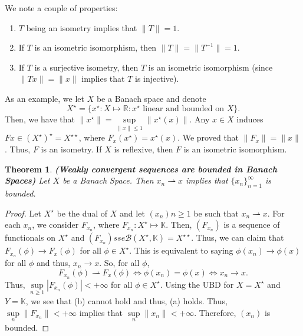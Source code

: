\documentclass[12pt]{article}
\newtheorem{theorem}{Theorem}
\newcommand{\R}{{\mathbb R}}
\def\K{\mathbb{K}}
\newcommand{\B}{\mathscr{B}}
\newcommand{\Xs}{X^{\star}}
\newcommand{\Xss}{X^{\star \star}}
\newcommand{\xst}{x^{\star}}
\newcommand{\weak}{\rightharpoonup}
\begin{document}
\vspace{-25pt}
We note a couple of properties:
\begin{enumerate}[topsep=-15pt, itemsep=0pt]
\item $T$ being an isometry implies that $\| T \| = 1$. 
\item If $T$ is an isometric isomorphism, then $\| T \| = \| T^{-1} \| = 1$. 
\item If $T$ is a surjective isometry, then $T$ is an isometric isomorphism (since $\| Tx \| = \| x \|$ implies that $T$ is injective).
\end{enumerate}
As an example, we let $X$ be a Banach space and denote 
\[ \Xs = \{ \xst: X \mapsto \R : \xst \text{ linear and bounded on } X \}. \]
Then, we have that $\| \xst \| = \sup\limits_{\| x \| \leq 1} \| \xst (x) \|$. Any $x \in X$ induces $Fx \in (\Xs)^{\star} = \Xss$, where $F_x(\xst) = \xst (x)$. We proved that $\| F_x \| = \| x \|$. Thus, $F$ is an isometry. If $X$ is reflexive, then $F$ is an isometric isomorphism. 
\begin{theorem}\textbf{(Weakly convergent sequences are bounded in Banach Spaces)} Let $X$ be a Banach Space. Then $x_n \weak x$ implies that $\{ x_n \}_{n=1}^{\infty}$ is bounded.
\end{theorem}
\vspace{-25pt}
\begin{proof}
Let $\Xs$ be the dual of $X$ and let $(x_n){n \geq 1}$ be such that $x_n \weak x$. For each $x_n$, we consider $F_{x_n}$, where $F_{x_n}: \Xs \mapsto \K$. Then, $(F_{x_n})$ is a sequence of functionals on $\Xs$ and $(F_{x_n}) sse \B(\Xs, \K) = \Xss$. Thus, we can claim that $F_{x_n}(\phi) \to F_x(\phi)$ for all $\phi \in \Xs$. This is equivalent to saying $\phi(x_n) \to \phi(x)$ for all $\phi$ and thus, $x_n \to x$. So, for all $\phi$, 
\[ F_{x_n}(\phi) \weak F_x(\phi) \Longleftrightarrow \phi(x_n) = \phi(x) \Longleftrightarrow x_n \to x.\]
Thus, $\sup\limits_{n \geq 1} | F_{x_n}(\phi) | < + \infty$ for all $\phi \in \Xs$. Using the UBD for $X = \Xs$ and $Y = \K$, we see that (b) cannot hold and thus, (a) holds. Thus, $\sup\limits_{n} \| F_{x_n} \| < + \infty$ implies that $\sup\limits_{n} \| x_n \| < +\infty$. Therefore, $(x_n)$ is bounded. 
\end{proof}
\end{document}
